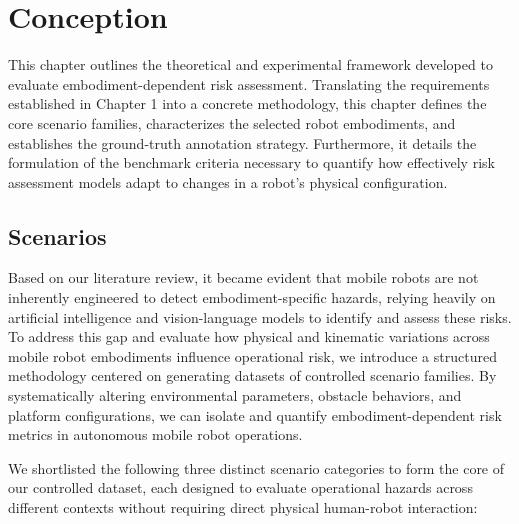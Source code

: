 \section{Conception}
\label{sec:conception}

This chapter outlines the theoretical and experimental framework developed to evaluate embodiment-dependent risk assessment. Translating the requirements established in Chapter 1 into a concrete methodology, this chapter defines the core scenario families, characterizes the selected robot embodiments, and establishes the ground-truth annotation strategy. Furthermore, it details the formulation of the benchmark criteria necessary to quantify how effectively risk assessment models adapt to changes in a robot's physical configuration. 

\subsection{Scenarios}
\label{sec:scenarios}

Based on our literature review, it became evident that mobile robots are not inherently engineered to detect embodiment-specific hazards, relying heavily on artificial intelligence and vision-language models to identify and assess these risks. To address this gap and evaluate how physical and kinematic variations across mobile robot embodiments influence operational risk, we introduce a structured methodology centered on generating datasets of controlled scenario families. By systematically altering environmental parameters, obstacle behaviors, and platform configurations, we can isolate and quantify embodiment-dependent risk metrics in autonomous mobile robot operations. 

We shortlisted the following three distinct scenario categories to form the core of our controlled dataset, each designed to evaluate operational hazards across different contexts without requiring direct physical human-robot interaction:

